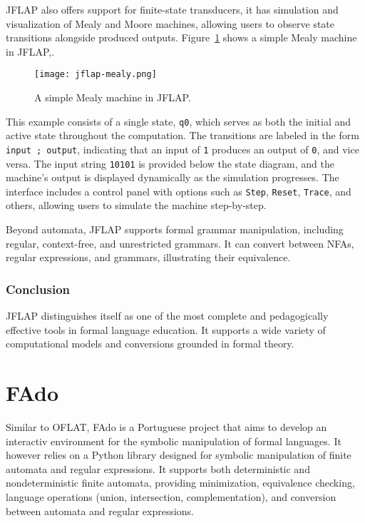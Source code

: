 JFLAP also offers support for finite-state transducers, it has simulation and visualization of Mealy and Moore machines, allowing users
to observe state transitions alongside produced outputs.
Figure~\ref{fig:jflap-mealy} shows a simple Mealy machine in JFLAP,.

\begin{figure}[H]
  \centering
  \texttt{[image: jflap-mealy.png]}
  \caption{A simple Mealy machine in JFLAP.}
  \label{fig:jflap-mealy}
\end{figure}

This example consists of a single state, \texttt{q0}, which serves as both the initial and active state throughout the computation. 
The transitions are labeled in the form \texttt{input ; output}, indicating that an input of \texttt{1} produces an output of \texttt{0}, 
and vice versa. The input string \texttt{10101} is provided below the state diagram, and the machine's output is displayed dynamically as the simulation progresses. 
The interface includes a control panel with options such as \texttt{Step}, \texttt{Reset}, \texttt{Trace}, and others, allowing users to simulate the machine step-by-step.


Beyond automata, JFLAP supports formal grammar manipulation, including regular, context-free, and unrestricted grammars. 
It can convert between NFAs, regular expressions, and grammars, illustrating their equivalence.

\subsubsection*{Conclusion}
JFLAP distinguishes itself as one of the most complete and pedagogically effective tools in formal language education. 
It supports a wide variety of computational models and conversions grounded in formal theory. 

\section{FAdo}
Similar to OFLAT, FAdo\cite{FAdo} is a Portuguese project that aims to develop an interactiv environment for the symbolic manipulation of formal languages. 
It however relies on a Python library designed for symbolic manipulation of finite automata and regular expressions. 
It supports both deterministic and nondeterministic finite automata, 
providing minimization, equivalence checking, language operations 
(union, intersection, complementation), and conversion between automata and regular expressions.

